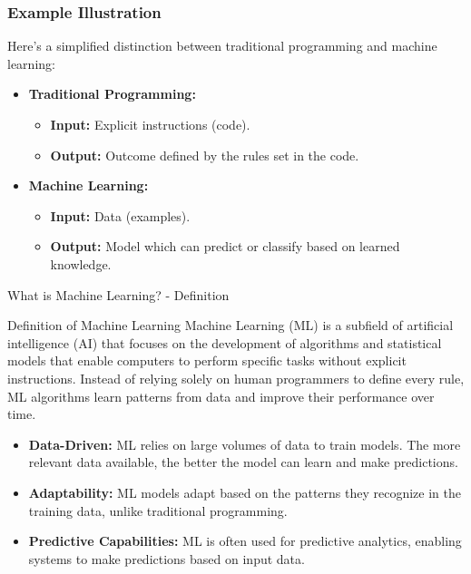 \documentclass[aspectratio=169]{beamer}
\begin{document}
\begin{frame}[fragile]
    \frametitle{Example Illustration}
    Here’s a simplified distinction between traditional programming and machine learning:
    
    \begin{itemize}
        \item \textbf{Traditional Programming:}
        \begin{itemize}
            \item \textbf{Input:} Explicit instructions (code).
            \item \textbf{Output:} Outcome defined by the rules set in the code.
        \end{itemize}
        
        \item \textbf{Machine Learning:}
        \begin{itemize}
            \item \textbf{Input:} Data (examples).
            \item \textbf{Output:} Model which can predict or classify based on learned knowledge.
        \end{itemize}
    \end{itemize}
\end{frame}

\begin{frame}[fragile]{What is Machine Learning? - Definition}
    \begin{block}{Definition of Machine Learning}
        Machine Learning (ML) is a subfield of artificial intelligence (AI) that focuses on the development of algorithms and statistical models that enable computers to perform specific tasks without explicit instructions.
        \newline
        Instead of relying solely on human programmers to define every rule, ML algorithms learn patterns from data and improve their performance over time.
    \end{block}
    
    \begin{itemize}
        \item \textbf{Data-Driven:} ML relies on large volumes of data to train models. The more relevant data available, the better the model can learn and make predictions.
        \item \textbf{Adaptability:} ML models adapt based on the patterns they recognize in the training data, unlike traditional programming.
        \item \textbf{Predictive Capabilities:} ML is often used for predictive analytics, enabling systems to make predictions based on input data.
    \end{itemize}
\end{frame}
\end{document}
